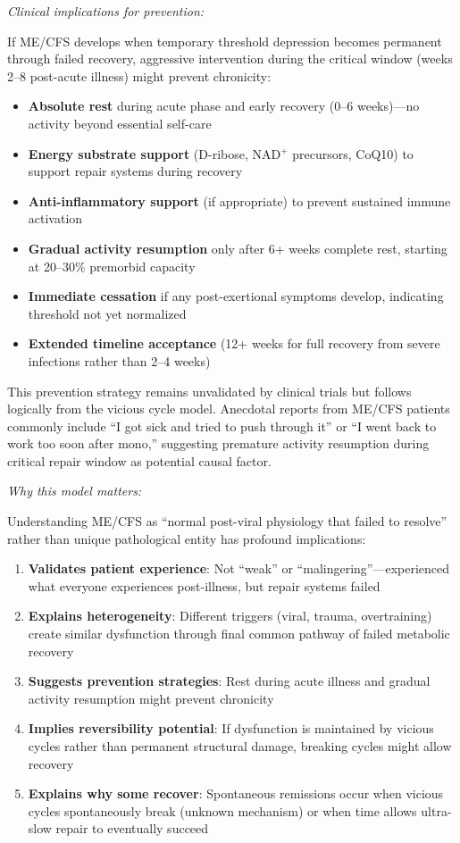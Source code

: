 \textit{Clinical implications for prevention:}

If ME/CFS develops when temporary threshold depression becomes permanent through failed recovery, aggressive intervention during the critical window (weeks 2--8 post-acute illness) might prevent chronicity:

\begin{itemize}
    \item \textbf{Absolute rest} during acute phase and early recovery (0--6 weeks)---no activity beyond essential self-care
    \item \textbf{Energy substrate support} (D-ribose, NAD$^+$ precursors, CoQ10) to support repair systems during recovery
    \item \textbf{Anti-inflammatory support} (if appropriate) to prevent sustained immune activation
    \item \textbf{Gradual activity resumption} only after 6+ weeks complete rest, starting at 20--30\% premorbid capacity
    \item \textbf{Immediate cessation} if any post-exertional symptoms develop, indicating threshold not yet normalized
    \item \textbf{Extended timeline acceptance} (12+ weeks for full recovery from severe infections rather than 2--4 weeks)
\end{itemize}

This prevention strategy remains unvalidated by clinical trials but follows logically from the vicious cycle model. Anecdotal reports from ME/CFS patients commonly include ``I got sick and tried to push through it'' or ``I went back to work too soon after mono,'' suggesting premature activity resumption during critical repair window as potential causal factor.

\textit{Why this model matters:}

Understanding ME/CFS as ``normal post-viral physiology that failed to resolve'' rather than unique pathological entity has profound implications:

\begin{enumerate}
    \item \textbf{Validates patient experience}: Not ``weak'' or ``malingering''---experienced what everyone experiences post-illness, but repair systems failed
    \item \textbf{Explains heterogeneity}: Different triggers (viral, trauma, overtraining) create similar dysfunction through final common pathway of failed metabolic recovery
    \item \textbf{Suggests prevention strategies}: Rest during acute illness and gradual activity resumption might prevent chronicity
    \item \textbf{Implies reversibility potential}: If dysfunction is maintained by vicious cycles rather than permanent structural damage, breaking cycles might allow recovery
    \item \textbf{Explains why some recover}: Spontaneous remissions occur when vicious cycles spontaneously break (unknown mechanism) or when time allows ultra-slow repair to eventually succeed
\end{enumerate}

